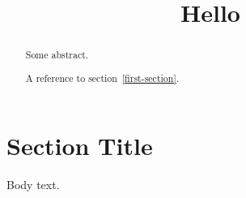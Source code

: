 
  \title{Hello}
  \maketitle
  \begin{abstract}
    Some abstract.

    A reference to section~\ref{first-section}.
  \end{abstract}

  \section{Section Title} \label{first-section}

  Body text.

